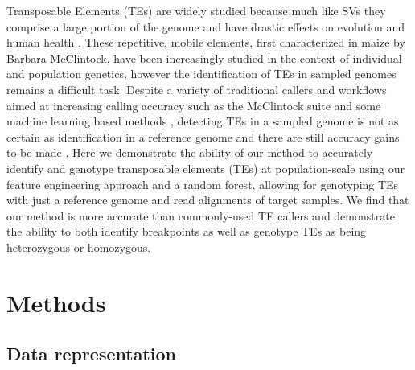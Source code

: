 Transposable Elements (TEs) are widely studied because much like SVs they comprise a large portion of the genome and have drastic effects on evolution \cite{CoronadoZamora2023, Merenciano2022, Rech2022blongreadte,VargasChavez2021mosquitote,SalcesOrtiz2020} and human health \cite{cordauxImpactRetrotransposonsHuman2009,hancksRolesRetrotransposonInsertions2016,landerInitialSequencingAnalysis2001, sudmantIntegratedMapStructural2015, zhouIdentificationCharacterizationOccult2020, leeLandscapeSomaticRetrotransposition2012}. These repetitive, mobile elements, first characterized in maize \cite{mcclintockOriginBehaviorMutable1950} by Barbara McClintock, have been increasingly studied in the context of individual and population genetics, however the identification of TEs in sampled genomes remains a difficult task. Despite a variety of traditional callers and workflows aimed at increasing calling accuracy such as the McClintock suite \cite{nelsonMcClintockIntegratedPipeline2017, chenReproducibleEvaluationTransposable2023} and some machine learning based methods \cite{xuIdentificationMobileElement2023, chuComprehensiveIdentificationTransposable2021}, detecting TEs in a sampled genome is not as certain as identification in a reference genome and there are still accuracy gains to be made \cite{VendrellMir2019}. Here we demonstrate the ability of our method to accurately identify and genotype transposable elements (TEs) at population-scale using our feature engineering approach and a random forest, allowing for genotyping TEs with just a reference genome and read alignments of target samples. We find that our method is more accurate than commonly-used TE callers and demonstrate the ability to both identify breakpoints as well as genotype TEs as being heterozygous or homozygous.


\section{Methods}

\subsection{Data representation}


